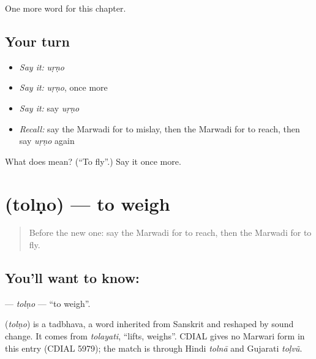 \begin{grammarlens}[title={What you've built}]
One more word for this chapter.
\end{grammarlens}

\subsection*{Your turn}
\begin{itemize}
\raggedright
  \item \emph{Say it:} \emph{uṛṇo}
  \item \emph{Say it:} \emph{uṛṇo}, once more
  \item \emph{Say it:} say \emph{uṛṇo}
  \item \emph{Recall:} say the Marwadi for to mislay, then the Marwadi for to reach, then say \emph{uṛṇo} again
\end{itemize}

\begin{tcolorbox}[breakable,colback=teal!4,colframe=teal!35!black,title={Before you move on}]
What does  mean? (\textquotedblleft{}To fly\textquotedblright{}.) Say it once more.
\end{tcolorbox}
\section[\texorpdfstring{\mw{तोलणो} (tolṇo)}{तोलणो (tolṇo)}]{ (tolṇo) — to weigh}

\label{lesson:MW-C110-tolno}



\begin{quote}
Before the new one: say the Marwadi for to reach, then the Marwadi for to fly.
\end{quote}

\subsection*{You'll want to know: }
\textbf{} — \emph{tolṇo} — \textquotedblleft{}to weigh\textquotedblright{}.

\begin{cousinweb}
\textbf{} (\emph{tolṇo}) is a tadbhava, a word inherited from Sanskrit and reshaped by sound change. It comes from \emph{tolayati}, \textquotedblleft{}lifts, weighs\textquotedblright{}. CDIAL gives no Marwari form in this entry (CDIAL 5979); the match is through Hindi \emph{tolnā} and Gujarati \emph{toḷvũ}.
\end{cousinweb}

